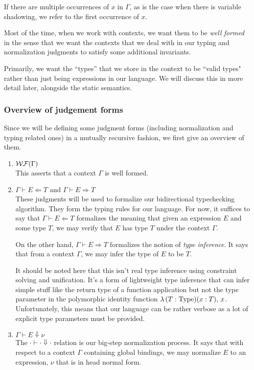 \documentclass{article}
\begin{document}
If there are multiple occurrences of $x$ in $\Gamma$,
as is the case when there is variable shadowing, we refer to the first occurrence
of $x$.

Most of the time, when we work with contexts, we want them to be \textit{well
formed} in the sense that we want the contexts that we deal with in our typing
and normalization judgments to satisfy some additional invariants.

Primarily, we want the ``types'' that we store in the context to be ``valid types"
rather than just being expressions in our language.
We will discuss this in more detail later, alongside the static semantics.

\subsubsection{Overview of judgement forms}
Since we will be defining some judgment forms (including normalization and
typing related ones) in a mutually recursive fashion, we first give an
overview of them.

\begin{enumerate}
\item $\operatorname{\mathcal{WF}}(\Gamma)$ \\
  This asserts that a context $\Gamma$ is well formed.

\item $\Gamma \vdash E \Leftarrow T$ and $\Gamma \vdash E \Rightarrow T$ \\
  These judgments will be used to formalize our bidirectional typechecking
  algorithm. They form the typing rules for our language.
  For now, it suffices to say that $\Gamma \vdash E \Leftarrow T$ formalizes the
  meaning that given an expression $E$ and some type $T$, we may verify that
  $E$ has type $T$ under the context $\Gamma$.

  On the other hand, $\Gamma \vdash E \Rightarrow T$ formalizes the notion of
  \textit{type inference}. It says that from a context $\Gamma$, we may infer
  the type of $E$ to be $T$. 
  
  It should be noted here that this isn't real type
  inference using constraint solving and unification. It's a form of lightweight
  type inference that can infer simple stuff like the return type of a function
  application but not the type parameter in the polymorphic identity function
  $\lambda \, (T : \operatorname{Type}) (x : T), \, x$. Unfortunately, this means that our
  language can be rather verbose as a lot of explicit type parameters must be
  provided.

\item $\Gamma \vdash E \Downarrow \nu$ \\
  The $\cdot \vdash \cdot \Downarrow \cdot$ relation is our big-step normalization
  process.
  It says that with respect to a context $\Gamma$ containing global bindings, we
  may normalize $E$ to an expression, $\nu$ that is in head normal form.
\end{enumerate}
\end{document}
